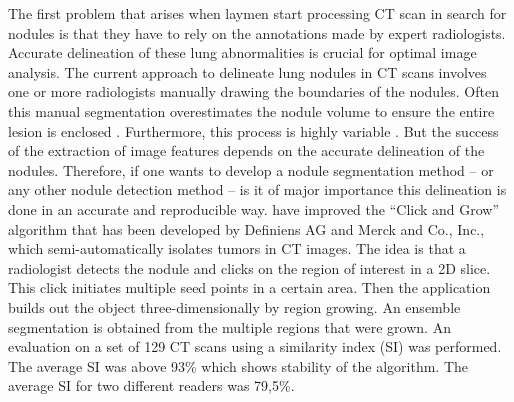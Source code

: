 The first problem that arises when laymen start processing CT scan in search
for nodules is that they have to rely on the annotations made by expert
radiologists. Accurate delineation of these lung abnormalities is crucial for
optimal image analysis. The current approach to delineate lung nodules in CT
scans involves one or more radiologists manually drawing the boundaries of the
nodules. Often this manual segmentation overestimates the nodule volume to
ensure the entire lesion is enclosed \cite{rex}. Furthermore, this process is
highly variable \cite{cooper}. But the success of the extraction of image
features depends on the accurate delineation of the nodules. Therefore, if one
wants to develop a nodule segmentation method -- or any other nodule detection
method -- is it of major importance this delineation is done in an accurate and
reproducible way. \cite{gu} have improved the ``Click and Grow'' algorithm that
has been developed by Definiens AG and Merck and Co., Inc., which
semi-automatically isolates tumors in CT images. The idea is that a radiologist
detects the nodule and clicks on the region of interest in a 2D slice. This
click initiates multiple seed points in a certain area. Then the application
builds out the object three-dimensionally by region growing. An ensemble
segmentation is obtained from the multiple regions that were grown. An
evaluation on a set of 129 CT scans using a similarity index (SI) was performed.
The average SI was above 93\% which shows stability of the algorithm. The
average SI for two different readers was 79,5\%.

